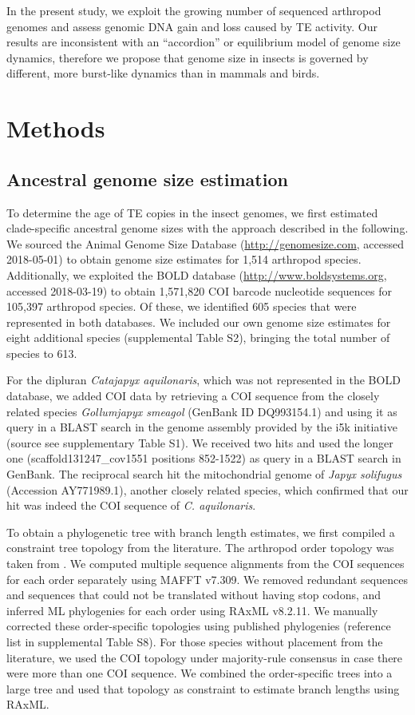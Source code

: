 In the present study, we exploit the growing number of sequenced
arthropod genomes and assess genomic DNA gain and loss caused by TE
activity. Our results are inconsistent with an ``accordion'' or
equilibrium model of genome size dynamics, therefore we propose that
genome size in insects is governed by different, more burst-like
dynamics than in mammals and birds.

\section{Methods}

\subsection*{Ancestral genome size
estimation}\label{ancestral-genome-size-estimation}

To determine the age of TE copies in the insect genomes, we first
estimated clade-specific ancestral genome sizes with the approach
described in the following. We sourced the Animal Genome Size Database
\citep{Gregory2018} (\url{http://genomesize.com}, accessed 2018-05-01) to
obtain genome size estimates for 1,514 arthropod species. Additionally,
we exploited the BOLD database \citep{Ratnasingham2007}
(\url{http://www.boldsystems.org}, accessed 2018-03-19) to obtain
1,571,820 COI barcode nucleotide sequences for 105,397 arthropod
species. Of these, we identified 605 species that were represented in
both databases. We included our own genome size estimates for eight
additional species (supplemental Table S2), bringing the total number of
species to 613.

For the dipluran \emph{Catajapyx aquilonaris}, which was not represented
in the BOLD database, we added COI data by retrieving a COI sequence
from the closely related species \emph{Gollumjapyx smeagol} (GenBank ID
DQ993154.1) and using it as query in a BLAST search in the genome
assembly provided by the i5k initiative (source see supplementary Table
S1). We received two hits and used the longer one
(scaffold131247\_cov1551 positions 852-1522) as query in a BLAST search
in GenBank. The reciprocal search hit the mitochondrial genome of
\emph{Japyx solifugus} (Accession AY771989.1), another closely related
species, which confirmed that our hit was indeed the COI sequence of
\emph{C. aquilonaris}.

To obtain a phylogenetic tree with branch length estimates, we first
compiled a constraint tree topology from the literature. The arthropod
order topology was taken from \citet{Misof2014}. We computed multiple
sequence alignments from the COI sequences for each order separately
using MAFFT v7.309. We removed redundant sequences and sequences that
could not be translated without having stop codons, and inferred ML
phylogenies for each order using RAxML v8.2.11. We manually corrected
these order-specific topologies using published phylogenies (reference
list in supplemental Table S8). For those species without placement from
the literature, we used the COI topology under majority-rule consensus
in case there were more than one COI sequence. We combined the
order-specific trees into a large tree and used that topology as
constraint to estimate branch lengths using RAxML.

